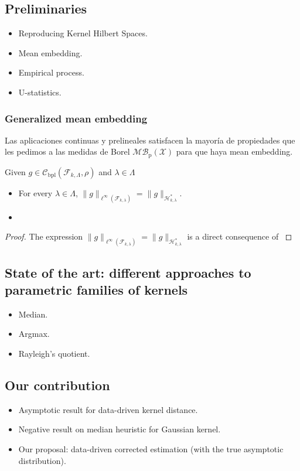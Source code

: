 	\subsection{Preliminaries}
		\begin{itemize}
			\item Reproducing Kernel Hilbert Spaces.
			\item Mean embedding.
			\item Empirical process.
			\item U-statistics.
		\end{itemize}
		\subsubsection*{Generalized mean embedding}
			{\color{orange}Las aplicaciones continuas y prelineales satisfacen la mayor\'{i}a de propiedades que les pedimos a las medidas de Borel $\mathcal{MB}_{\operatorname{p}}(\mathcal{X})$ para que haya mean embedding.}
			\begin{Lema}
				Given $g\in\mathcal{C}_{\operatorname{bpl}}\left(\mathcal{F}_{k,\Lambda},\rho\right)$ and $\lambda\in\Lambda$
				\begin{itemize}
					\item For every $\lambda\in\Lambda$, $\|g\|_{\ell^{\infty}\left(\mathcal{F}_{k,\lambda}\right)}=\|g\|_{\mathcal{H}_{k,\lambda}^{\ast}}$.
					\item
				\end{itemize}
			\end{Lema}
			\begin{proof}
				The expression $\|g\|_{\ell^{\infty}\left(\mathcal{F}_{k,\lambda}\right)}=\|g\|_{\mathcal{H}_{k,\lambda}^{\ast}}$ is a direct consequence of \textcite[Lemma 2.30, p. 88]{Dudley1999}
			\end{proof}
	\subsection{State of the art: different approaches to parametric families of kernels}
		\begin{itemize}
			\item Median.
			\item Argmax.
			\item Rayleigh's quotient.
		\end{itemize}
	\subsection{Our contribution}
		\begin{itemize}
			\item Asymptotic result for data-driven kernel distance.
			\item Negative result on median heuristic for Gaussian kernel.
			\item Our proposal: data-driven corrected estimation (with the true asymptotic distribution).
		\end{itemize}
